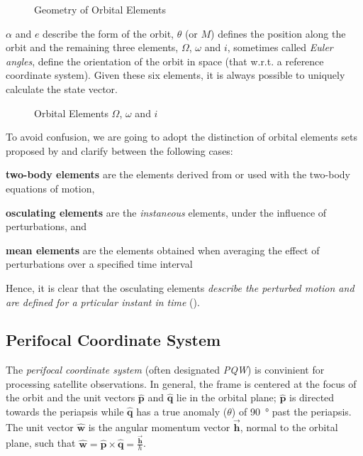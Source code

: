 \begin{figure}
\centering

\caption{Geometry of Orbital Elements}
\label{fig:orbital-elements-3d}
\end{figure}

$\alpha$ and $e$ describe the form of the orbit, $\theta$ (or $M$) defines the 
position along the orbit and the remaining three elements, $\Omega$, $\omega$ 
and $i$, sometimes called \emph{Euler angles}, define the orientation of the 
orbit in space (that w.r.t. a reference coordinate system). Given these six 
elements, it is always possible to uniquely calculate the state vector.

\begin{figure}
\centering

\caption{Orbital Elements $\Omega$, $\omega$ and $i$}
\label{fig:orbital-elements-Ooi}
\end{figure}

To avoid confusion, we are going to adopt the distinction of orbital elements 
sets proposed by \cite{Vallado} and clarify between the following cases:
\begin{description}
  \item \textbf{two-body elements} are the elements derived from or used with 
    the two-body equations of motion,
  \item \textbf{osculating elements} are the \emph{instaneous} elements, under 
    the influence of perturbations, and
  \item \textbf{mean elements} are the elements obtained when averaging the 
    effect of perturbations over a specified time interval
\end{description}
Hence, it is clear that the osculating elements \emph{describe the perturbed 
motion and are defined for a prticular instant in time} (\cite{Vallado}).

\subsection{Perifocal Coordinate System}
The \emph{perifocal coordinate system} (often designated \emph{PQW}) is 
convinient for processing satellite observations. In general, the frame is 
centered at the focus of the orbit and the unit vectors $\hat{\bm{p}}$ and 
$\hat{\bm{q}}$ lie in the orbital plane; $\hat{\bm{p}}$ is directed towards 
the periapsis while $\hat{\bm{q}}$ has a true anomaly ($\theta$) of 
\SI{90}{\degree} past the periapsis. The unit vector $\hat{\bm{w}}$ is the 
angular momentum vector $\vec{\bm{h}}$, normal to the orbital plane, such that 
$\hat{\bm{w}} = \hat{\bm{p}} \times \hat{\bm{q}} = \frac{\vec{\bm{h}}}{h}$.

